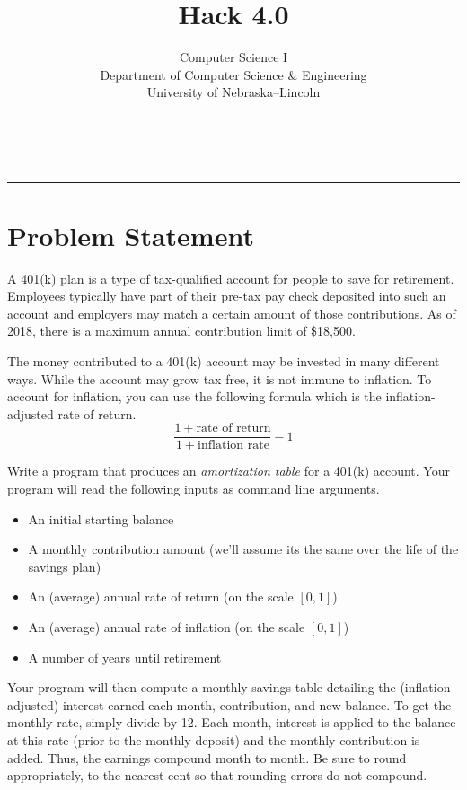 \documentclass[12pt]{scrartcl}
\title{Hack 4.0}\let\Title\@title
\subtitle{Computer Science I\\
{\small
\vskip1cm
Department of Computer Science \& Engineering \\
University of Nebraska--Lincoln}
\vskip-1cm}
\date{~}
\begin{document}
\maketitle

\hrule




\section*{Problem Statement}

A 401(k) plan is a type of tax-qualified account for people to save 
for retirement.  Employees typically have part of their pre-tax pay
check deposited into such an account and employers may match a certain
amount of those contributions.  As of 2018, there is a maximum
annual contribution limit of \$18,500.
 
The money contributed to a 401(k) account may be invested in many
different ways.  While the account may grow tax free, it is not 
immune to inflation.  To account for inflation, you can use
the following formula which is the inflation-adjusted rate of
return.
  $$\frac{1 + \textrm{rate of return}}{1+\textrm{inflation rate}} - 1$$

Write a program that produces an \emph{amortization table} for a
401(k) account.  Your program will read the following inputs as 
command line arguments.
\begin{itemize}
  \item An initial starting balance
  \item A monthly contribution amount (we'll assume its the same over the life of the savings plan)
  \item An (average) annual rate of return (on the scale $[0, 1]$)
  \item An (average) annual rate of inflation (on the scale $[0, 1]$)
  \item A number of years until retirement
\end{itemize}
Your program will then compute a monthly savings table detailing
the (inflation-adjusted) interest earned each month, contribution, and
new balance.  To get the monthly rate, simply divide by 12.  Each month, 
interest is applied to the balance at this rate (prior to the monthly 
deposit) and the monthly contribution is added.  Thus, the earnings 
compound month to month.  Be sure to round appropriately, to the nearest
cent so that rounding errors do not compound.
\end{document}
